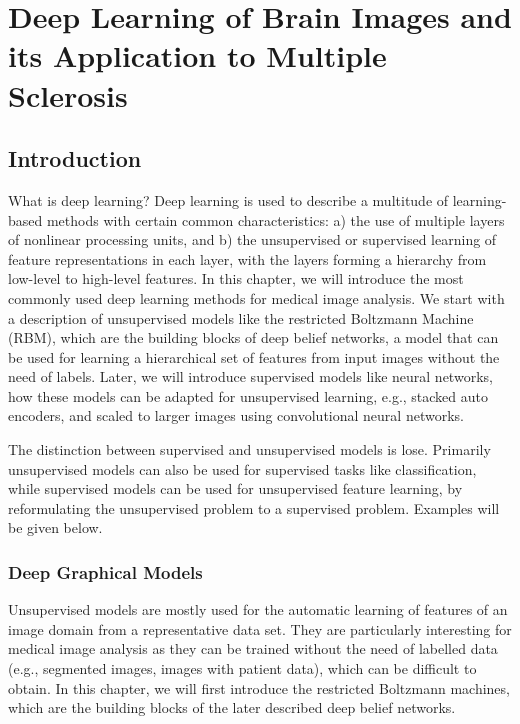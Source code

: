 \documentclass{report}
\begin{document}
\chapter{Deep Learning of Brain Images and its Application to Multiple Sclerosis}

\section{Introduction}

What is deep learning? Deep learning is used to describe a multitude of
learning-based methods with certain common characteristics: a) the use of
multiple layers of nonlinear processing units, and b) the unsupervised or
supervised learning of feature representations in each layer, with the layers
forming a hierarchy from low-level to high-level features. In this chapter, we
will introduce the most commonly used deep learning methods for medical image
analysis. We start with a description of unsupervised models like the restricted
Boltzmann Machine (RBM), which are the building blocks of deep belief networks,
a model that can be used for learning a hierarchical set of features from input
images without the need of labels. Later, we will introduce supervised models
like neural networks, how these models can be adapted for unsupervised learning,
e.g., stacked auto encoders, and scaled to larger images using convolutional
neural networks.

The distinction between supervised and unsupervised models is lose. Primarily
unsupervised models can also be used for supervised tasks like classification,
while supervised models can be used for unsupervised feature learning, by
reformulating the unsupervised problem to a supervised problem. Examples will be
given below.

\subsection{Deep Graphical Models}

Unsupervised models are mostly used for the automatic learning of features of an
image domain from a representative data set. They are particularly interesting
for medical image analysis as they can be trained without the need of labelled
data (e.g., segmented images, images with patient data), which can be difficult
to obtain. In this chapter, we will first introduce the restricted Boltzmann
machines, which are the building blocks of the later described deep belief
networks.
\end{document}
